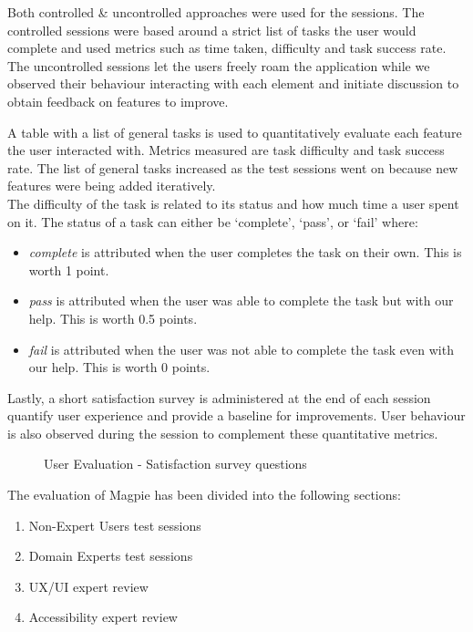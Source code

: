 \newpage{}

\noindent Both controlled \& uncontrolled approaches were used for the sessions.
The controlled sessions were based around a strict list of tasks the user would
complete and used metrics such as time taken, difficulty and task success rate.
The uncontrolled sessions let the users freely roam the application while we
observed their behaviour interacting with each element and initiate discussion
to obtain feedback on features to improve.

\noindent A table with a list of general tasks is used to quantitatively evaluate each feature the user interacted with. Metrics measured are task difficulty and task success rate. The list of general tasks increased as the test sessions went on because new features were being added iteratively.\\
The difficulty of the task is related to its status and how much time a user spent on it. The status of a task can either be `complete', `pass', or `fail' where:

\begin{itemize}
    \item \emph{complete} is attributed when the user completes the task on their own. This is worth 1 point.
    \item \emph{pass} is attributed when the user was able to complete the task but with our help. This is worth 0.5 points.
    \item \emph{fail} is attributed when the user was not able to complete the task even with our help. This is worth 0 points.
\end{itemize}

Lastly, a short satisfaction survey is administered at the end of each session
quantify user experience and provide a baseline for improvements. User behaviour
is also observed during the session to complement these quantitative metrics.

\begin{figure}[h!]
    \centering
    \caption{User Evaluation - Satisfaction survey questions}
\end{figure}

\newpage{}

The evaluation of Magpie has been divided into the following sections:
\begin{enumerate}
    \item Non-Expert Users test sessions
    \item Domain Experts test sessions
    \item UX/UI expert review
    \item Accessibility expert review
\end{enumerate}
